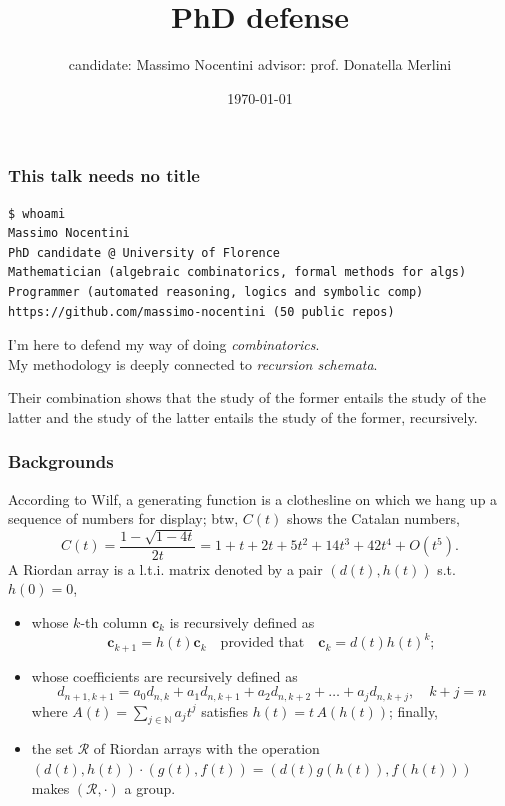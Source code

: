 \documentclass[9pt]{beamer}
\title{PhD defense}
\author{{\small candidate:} Massimo Nocentini \hfill {\small advisor:} prof. Donatella Merlini }
\institute{University of Florence, Italy.}
\date{\today}
\begin{document}
\frame{\titlepage}


\begin{frame}[fragile]
\frametitle{This talk needs no title}
\begin{Verbatim}
$ whoami
Massimo Nocentini
PhD candidate @ University of Florence
Mathematician (algebraic combinatorics, formal methods for algs)
Programmer (automated reasoning, logics and symbolic comp)
https://github.com/massimo-nocentini (50 public repos)
\end{Verbatim}

\begin{block}{}
I'm here to defend my way of doing \textit{combinatorics}. \\
My methodology is deeply connected to \textit{recursion schemata}.

Their combination shows that the study of the former entails the study of the
latter and the study of the latter entails the study of the former,
recursively.
\end{block}

\end{frame}

\begin{frame}[fragile]
\frametitle{Backgrounds}
According to Wilf, a
generating function is a clothesline on which we hang up a sequence of
numbers for display; btw, $C(t)$ shows the Catalan numbers,
\begin{displaymath}
 C(t) = \frac{1-\sqrt{1-4t}}{2t} = 1 + t + 2t + 5t^{2} + 14t^{3} + 42t^{4} + O(t^{5}).
\end{displaymath}
A Riordan array is a l.t.i. matrix denoted by a pair $(d(t), h(t))$ s.t. $h(0)=0$, 
\begin{itemize}
\item whose $k$-th column $\textbf{c}_{k}$ is recursively defined as 
\begin{displaymath}
 \textbf{c}_{k+1} =h(t) \textbf{c}_{k} \quad\text{provided that}\quad \textbf{c}_{k} = d(t)h(t)^{k} ;
\end{displaymath}
\item whose coefficients are recursively defined as
\begin{displaymath}
 d_{n+1, k+1} = a_{0}d_{n, k} + a_{1}d_{n, k+1} + a_{2}d_{n, k+2} + \ldots + a_{j}d_{n, k + j}, \quad k + j = n
\end{displaymath}
where $A(t) = \sum_{j\in\mathbb{N}}{a_{j}t^{j}}$ satisfies $h(t) = t\,A(h(t))$; finally,
\item the set $\mathcal{R}$ of Riordan arrays with the
operation $(d(t), h(t))\cdot(g(t), f(t)) = (d(t)g(h(t)), f(h(t)))$
makes $(\mathcal{R}, \cdot)$ a group.
\end{itemize}


\end{frame}
\end{document}
